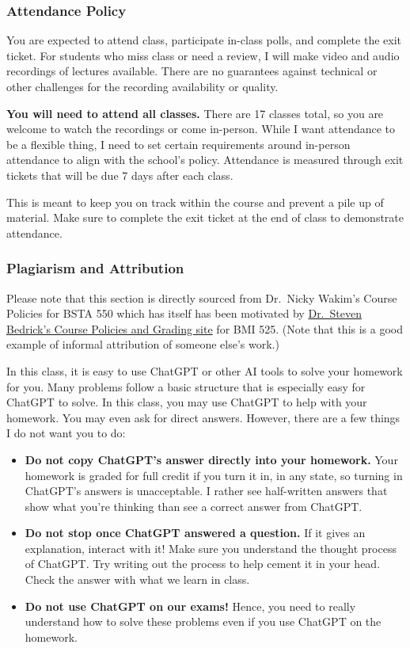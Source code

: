 \documentclass[
  letterpaper,
  DIV=11,
  numbers=noendperiod]{scrartcl}
\begin{document}
\subsubsection{Attendance Policy}\label{attendance-policy}

You are expected to attend class, participate in-class polls, and
complete the exit ticket. For students who miss class or need a review,
I will make video and audio recordings of lectures available. There are
no guarantees against technical or other challenges for the recording
availability or quality.

\textbf{You will need to attend all classes.} There are 17 classes
total, so you are welcome to watch the recordings or come in-person.
While I want attendance to be a flexible thing, I need to set certain
requirements around in-person attendance to align with the school's
policy. Attendance is measured through exit tickets that will be due 7
days after each class.

This is meant to keep you on track within the course and prevent a pile
up of material. Make sure to complete the exit ticket at the end of
class to demonstrate attendance.

\subsubsection{Plagiarism and
Attribution}\label{plagiarism-and-attribution}

Please note that this section is directly sourced from Dr.~Nicky Wakim's
Course Policies for BSTA 550 which has itself has been motivated by
\href{https://dmice.ohsu.edu/bedricks/courses/bmi525/policies.html}{Dr.~Steven
Bedrick's Course Policies and Grading site} for BMI 525. (Note that this
is a good example of informal attribution of someone else's work.)

In this class, it is easy to use ChatGPT or other AI tools to solve your
homework for you. Many problems follow a basic structure that is
especially easy for ChatGPT to solve. In this class, you may use ChatGPT
to help with your homework. You may even ask for direct answers.
However, there are a few things I do not want you to do:

\begin{itemize}
\item
  \textbf{Do not copy ChatGPT's answer directly into your homework.}
  Your homework is graded for full credit if you turn it in, in any
  state, so turning in ChatGPT's answers is unacceptable. I rather see
  half-written answers that show what you're thinking than see a correct
  answer from ChatGPT.
\item
  \textbf{Do not stop once ChatGPT answered a question.} If it gives an
  explanation, interact with it! Make sure you understand the thought
  process of ChatGPT. Try writing out the process to help cement it in
  your head. Check the answer with what we learn in class.
\item
  \textbf{Do not use ChatGPT on our exams!} Hence, you need to really
  understand how to solve these problems even if you use ChatGPT on the
  homework.
\end{itemize}
\end{document}
